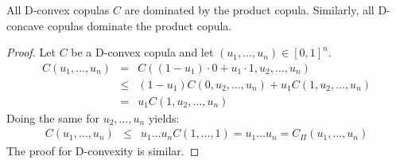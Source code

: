 \begin{proposition}
    All D-convex copulas $C$ are dominated by the product copula. 
    Similarly, all D-concave copulas dominate the product copula.
\end{proposition}
\begin{proof}
    Let $C$ be a D-convex copula and let $(u_1, \dots, u_n)\in[0,1]^n$.
    \begin{eqnarray*}
        C(u_1,\dots, u_n) &=& C((1-u_1)\cdot0+u_1\cdot 1, u_2, \dots, u_n)\\
        &\leqslant& (1-u_1)C(0, u_2,\dots, u_n)+u_1C(1, u_2, \dots, u_n)\\
        &=& u_1C(1, u_2,\dots, u_n)
    \end{eqnarray*}
    Doing the same for $u_2,\dots,u_n$ yields:
    \begin{eqnarray*}
        C(u_1,\dots, u_n) &\leqslant& u_1\dots u_nC(1,\dots,1) = u_1\dots u_n = C_\Pi(u_1,\dots,u_n)
    \end{eqnarray*}
    The proof for D-convexity is similar.
\end{proof}


